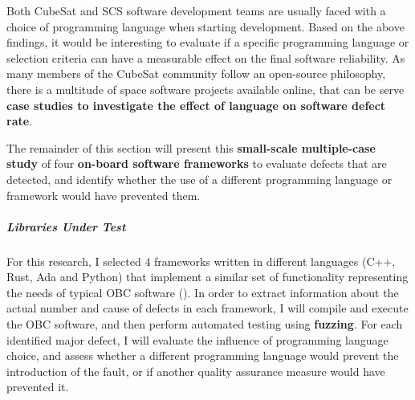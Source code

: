 \documentclass[a4paper,nobib,justified,final]{tufte-book}
\begin{document}
Both CubeSat and \acs{SCS} software development teams are usually faced with a choice of programming language when starting development. Based on the above findings, it would be interesting to evaluate if a specific programming language or selection criteria can have a measurable effect on the final software reliability. As many members of the CubeSat community follow an open-source philosophy, there is a multitude of space software projects available online, that can be serve \textbf{case studies to investigate the effect of language on software defect rate}.

The remainder of this section will present this \textbf{small-scale multiple-case study} of four \textbf{on-board software frameworks} to evaluate defects that are detected, and identify whether the use of a different programming language or framework would have prevented them.

\subparagraph{Libraries Under Test}
For this research, I selected 4 frameworks written in different languages (C++, Rust, Ada and Python) that implement a similar set of functionality representing the needs of typical \acs{OBC} software (). In order to extract information about the actual number and cause of defects in each framework, I will compile and execute the \acs{OBC} software, and then perform automated testing using \textbf{fuzzing}. For each identified major defect, I will evaluate the influence of programming language choice, and assess whether a different programming language would prevent the introduction of the fault, or if another quality assurance measure would have prevented it.
\end{document}

